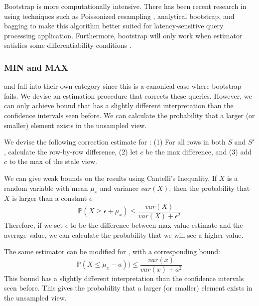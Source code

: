 Bootstrap is more computationally intensive.
There has been recent research in using techniques such as Poissonized resampling \cite{agarwalknowing}, analytical bootstrap\cite{DBLP:conf/sigmod/ZengGMZ14}, and bagging \cite{DBLP:conf/kdd/KleinerTASJ13} to make this algorithm better suited for latency-sensitive query processing application.
Furthermore, bootstrap will only work when estimator satisfies some differentiability conditions \cite{agarwalknowing}.

\subsubsection{MIN and MAX}
\minfunc and \maxfunc fall into their own category since this is a canonical case where bootstrap fails.
We devise an estimation procedure that corrects these queries.
However, we can only achieve bound that has a slightly different interpretation than the confidence intervals seen before.
We can calculate the probability that a larger (or smaller) element exists in the unsampled view.

We devise the following correction estimate for \maxfunc: (1) For all rows in both $S$ and $S'$, calculate the row-by-row difference, (2) let $c$ be the max difference, and (3) add $c$ to the max of the stale view.

We can give weak bounds on the results using Cantelli's Inequality.
If $X$ is a random variable with mean $\mu_x$ and variance $var(X)$, then the probability that $X$ is larger than a constant $\epsilon$ 
\[
\mathbb{P}(X \ge \epsilon + \mu_x ) \le \frac{var(X)}{var(X) + \epsilon^2}
\]
Therefore, if we set $\epsilon$ to be the difference between max value estimate and the average value, we can calculate the probability that we will see a higher value. 

The same estimator can be modified for \minfunc, with a corresponding bound:
\[
\mathbb{P}(X \le \mu_x - a )) \le \frac{var(x)}{var(x) + a^2}
\]
This bound has a slightly different interpretation than the confidence intervals seen before.
This gives the probability that a larger (or smaller) element exists in the unsampled view.

